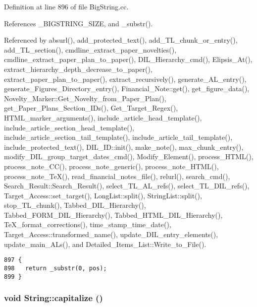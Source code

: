 Definition at line 896 of file Big\-String.cc.

References \_\-BIGSTRING\_\-SIZE, and \_\-substr().

Referenced by absurl(), add\_\-protected\_\-text(), add\_\-TL\_\-chunk\_\-or\_\-entry(), add\_\-TL\_\-section(), cmdline\_\-extract\_\-paper\_\-novelties(), cmdline\_\-extract\_\-paper\_\-plan\_\-to\_\-paper(), DIL\_\-Hierarchy\_\-cmd(), Elipsis\_\-At(), extract\_\-hierarchy\_\-depth\_\-decrease\_\-to\_\-paper(), extract\_\-paper\_\-plan\_\-to\_\-paper(), extract\_\-recursively(), generate\_\-AL\_\-entry(), generate\_\-Figures\_\-Directory\_\-entry(), Financial\_\-Note::get(), get\_\-figure\_\-data(), Novelty\_\-Marker::Get\_\-Novelty\_\-from\_\-Paper\_\-Plan(), get\_\-Paper\_\-Plans\_\-Section\_\-IDs(), Get\_\-Target\_\-Regex(), HTML\_\-marker\_\-arguments(), include\_\-article\_\-head\_\-template(), include\_\-article\_\-section\_\-head\_\-template(), include\_\-article\_\-section\_\-tail\_\-template(), include\_\-article\_\-tail\_\-template(), include\_\-protected\_\-text(), DIL\_\-ID::init(), make\_\-note(), max\_\-chunk\_\-entry(), modify\_\-DIL\_\-group\_\-target\_\-dates\_\-cmd(), Modify\_\-Element(), process\_\-HTML(), process\_\-note\_\-CC(), process\_\-note\_\-generic(), process\_\-note\_\-HTML(), process\_\-note\_\-Te\-X(), read\_\-financial\_\-notes\_\-file(), relurl(), search\_\-cmd(), Search\_\-Result::Search\_\-Result(), select\_\-TL\_\-AL\_\-refs(), select\_\-TL\_\-DIL\_\-refs(), Target\_\-Access::set\_\-target(), Long\-List::split(), String\-List::split(), stop\_\-TL\_\-chunk(), Tabbed\_\-DIL\_\-Hierarchy(), Tabbed\_\-FORM\_\-DIL\_\-Hierarchy(), Tabbed\_\-HTML\_\-DIL\_\-Hierarchy(), Te\-X\_\-format\_\-corrections(), time\_\-stamp\_\-time\_\-date(), Target\_\-Access::transformed\_\-name(), update\_\-DIL\_\-entry\_\-elements(), update\_\-main\_\-ALs(), and Detailed\_\-Items\_\-List::Write\_\-to\_\-File().



\footnotesize\begin{verbatim}897 {
898   return _substr(0, pos);
899 }
\end{verbatim}\normalsize 
{}
\subsubsection{\setlength{\rightskip}{0pt plus 5cm}void String::capitalize ()\hspace{0.3cm}{\tt  [inline]}}\label{classString_a97}




